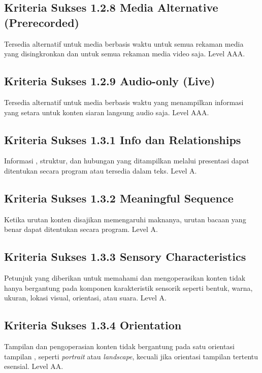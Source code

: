 \subsection{Kriteria Sukses 1.2.8 Media Alternative (Prerecorded)}
\label{sec:kriteria_1.2.8}
Tersedia alternatif untuk media berbasis waktu untuk semua rekaman media yang disingkronkan dan untuk semua rekaman media video saja.
Level AAA.

\subsection{Kriteria Sukses 1.2.9 Audio-only (Live)}
\label{sec:kriteria_1.2.9}
Tersedia alternatif untuk media berbasis waktu yang menampilkan informasi yang setara untuk konten siaran langsung audio saja.
Level AAA.

\subsection{Kriteria Sukses 1.3.1 Info dan Relationships}
\label{sec:kriteria_1.3.1}
Informasi , struktur, dan hubungan yang ditampilkan melalui presentasi dapat ditentukan secara program atau tersedia dalam teks.
Level A.

\subsection{Kriteria Sukses 1.3.2 Meaningful Sequence}
\label{sec:kriteria_1.3.2}
Ketika urutan konten disajikan memengaruhi maknanya, urutan bacaan yang benar dapat ditentukan secara program.
Level A.

\subsection{Kriteria Sukses 1.3.3 Sensory Characteristics}
\label{sec:kriteria_1.3.3}
Petunjuk yang diberikan untuk memahami dan mengoperasikan konten tidak hanya bergantung pada komponen karakteristik sensorik seperti bentuk, warna, ukuran, lokasi visual, orientasi, atau suara.
Level A.

\subsection{Kriteria Sukses 1.3.4 Orientation}
\label{sec:kriteria_1.3.4}
Tampilan dan pengoperasian konten tidak bergantung pada satu orientasi tampilan , seperti \textit{portrait} atau \textit{landscape}, kecuali jika orientasi tampilan tertentu esensial.
Level AA.

